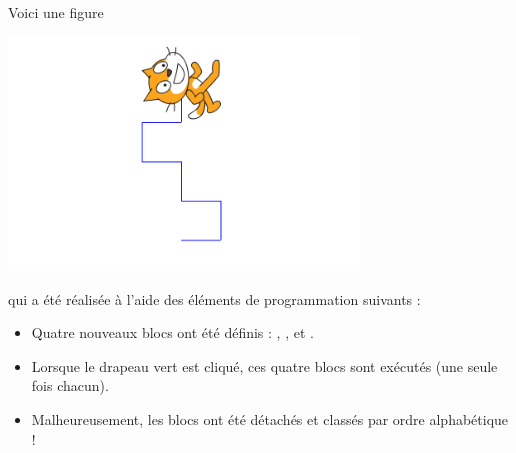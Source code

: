 \documentclass[class=report,crop=false, 12pt]{standalone}
\begin{document}


\begin{enigme}

Voici une figure 
\begin{center}
  \includegraphics[width=0.7\textwidth]{ecran-11-eg1} 
\end{center}
qui a été réalisée à l'aide des éléments de programmation suivants : %

\begin{minipage}{0.49\textwidth}
\begin{itemize}
  \item Quatre nouveaux blocs ont été définis : 
  ,  ,   et  .

\bigskip
  
  \item Lorsque le drapeau vert est cliqué, ces quatre blocs sont exécutés (une seule fois chacun).
  
\bigskip
  
  \item Malheureusement, les blocs ont été détachés et classés par ordre alphabétique !%
  
\end{itemize} 
\end{minipage}
\begin{minipage}{0.49\textwidth}
\begin{center}
\begin{scratch}
  \blockspace[0.5]
  \blockspace[0.5]
  \blockspace[0.5]
  \blockspace[0.5]
\end{scratch}
\end{center} 
\end{minipage}


\end{enigme}
\end{document}
